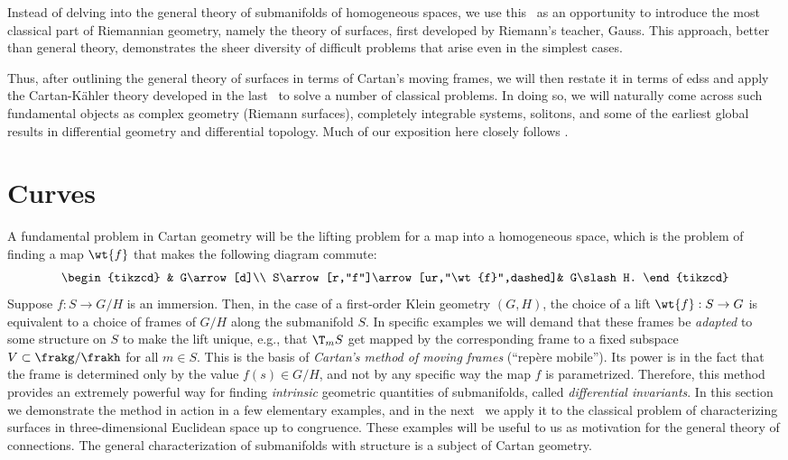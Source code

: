 Instead of delving into the general theory of submanifolds of homogeneous spaces, we use this \chap\ as an opportunity to introduce the most classical part of Riemannian geometry, namely the theory of surfaces, first developed by Riemann's teacher, Gauss. This approach, better than general theory, demonstrates the sheer diversity of difficult problems that arise even in the simplest cases.

Thus, after outlining the general theory of surfaces in terms of Cartan's moving frames, we will then restate it in terms of \glspl{eds} and apply the Cartan-K\"ahler theory developed in the last \chap\ to solve a number of classical problems. In doing so, we will naturally come across such fundamental objects as complex geometry (Riemann surfaces), completely integrable systems, solitons, and some of the earliest global results in differential geometry and differential topology. Much of our exposition here closely follows \cite{Ivey}.




\section{Curves}

A fundamental problem in Cartan geometry will be the lifting problem for a map into a homogeneous space, which is the problem of finding a map $\wt{f}$ that makes the following diagram commute:
\[\begin{tikzcd}
                                    & G\arrow[d]\\
    S\arrow[r,"f"]\arrow[ur,"\wt{f}",dashed]& G\slash H.
\end{tikzcd}\]
Suppose $f:S\to G\slash H$ is an immersion. Then, in the case of a first-order Klein geometry $(G,H)$, the choice of a lift $\wt{f}:S\to G$ is equivalent to a choice of frames of $G\slash H$ along the submanifold $S$. In specific examples we will demand that these frames be \emph{adapted} to some structure on $S$ to make the lift unique, e.g., that $\T_mS$ get mapped by the corresponding frame to a fixed subspace $V\subset \frakg\slash\frakh$ for all $m\in S$. This is the basis of \emph{Cartan's method of moving frames} (``rep\`ere mobile''). Its power is in the fact that the frame is determined only by the value $f(s)\in G\slash H$, and not by any specific way the map $f$ is parametrized. Therefore, this method provides an extremely powerful way for finding \emph{intrinsic} geometric quantities of submanifolds, called \emph{differential invariants}. In this section we demonstrate the method in action in a few elementary examples, and in the next \sect\ we apply it to the classical problem of characterizing surfaces in three-dimensional Euclidean space up to congruence. These examples will be useful to us as motivation for the general theory of connections. The general characterization of submanifolds with structure is a subject of Cartan geometry.

